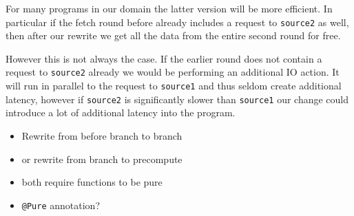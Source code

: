 For many programs in our domain the latter version will be more efficient.
In particular if the fetch round before already includes a request to \texttt{source2} as well, then after our rewrite we get all the data from the entire second round for free.

However this is not always the case.
If the earlier round does not contain a request to \texttt{source2} already we would be performing an additional IO action.
It will run in parallel to the request to \texttt{source1} and thus seldom create additional latency, however if \texttt{source2} is significantly slower than \texttt{source1} our change could introduce a lot of additional latency into the program.

\begin{itemize}
  \item Rewrite from before branch to branch
  \item or rewrite from branch to precompute
  \item both require functions to be pure
  \item \texttt{@Pure} annotation?
\end{itemize}
